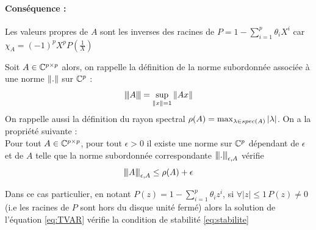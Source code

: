 \documentclass{report}
\begin{document}
\paragraph{Conséquence :}
Les valeurs propres de $A$ sont les inverses des racines de $P = 1- \sum_{i=1}^p \theta_i X^i$
car $\chi_A = (-1)^p X^p P\left( \frac{1}{X}\right)$
\begin{Lem}\label{lem:approx_rayon_spec}
Soit $A \in \mathbb{C}^{p\times p}$ alors, on rappelle la définition de la norme subordonnée associée à une norme ${ \left\| . \right\|}$ sur $\mathbb{C}^p$ : \[
{\left\vert\kern-0.25ex\left\vert\kern-0.25ex\left\vert A \right\vert\kern-0.25ex\right\vert\kern-0.25ex\right\vert} = \sup_{{ \left\| x \right\|} = 1} { \left\| Ax \right\|}
\]
On rappelle aussi la définition du rayon spectral $ \rho(A) = \max_{\lambda \in spec(A)} { \left| \lambda \right|}$. On a la propriété suivante : \\
Pour tout $A \in \mathbb{C}^{p\times p}$, pour tout  $\epsilon >0$ il existe une norme sur $\mathbb{C}^p$ dépendant de $\epsilon$ et de $A$ telle que la norme subordonnée correspondante ${\left\vert\kern-0.25ex\left\vert\kern-0.25ex\left\vert . \right\vert\kern-0.25ex\right\vert\kern-0.25ex\right\vert}_{\epsilon,A}$ vérifie
\[
{\left\vert\kern-0.25ex\left\vert\kern-0.25ex\left\vert A \right\vert\kern-0.25ex\right\vert\kern-0.25ex\right\vert}_{\epsilon,A} \leq \rho(A) + \epsilon
\]
\end{Lem}
\begin{Prop}
Dans ce cas particulier, en notant $P(z) = 1 - \sum_{i=1}^p \theta_i z^i$, si $\forall |z| \leq 1\, P(z)\neq 0$ (i.e les racines de $P$ sont hors du disque unité fermé) alors la solution de l'équation \eqref{eq:TVAR} vérifie la condition de stabilité \eqref{eq:stabilite}
\end{Prop}
\end{document}
